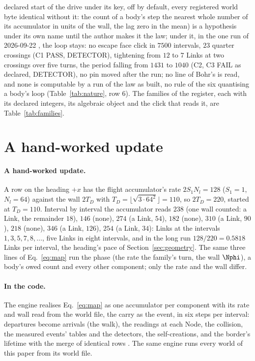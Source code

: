 declared start of the drive under its key, off by default, every registered world byte identical without it: the count of a body's step the nearest whole number of its accumulator in units of the wall, the lag zero in the mean) is a hypothesis under its own name until the author makes it the law; under it, in the one run of 2026-09-22 \cite{atomcentred}, the loop stays: no escape face click in $7500$ intervals, $23$ quarter crossings (C1 PASS, DETECTOR), tightening from $12$ to $7$ Links at two crossings over five turns, the period falling from $1431$ to $1040$ (C2, C3 FAIL as declared, DETECTOR), no pin moved after the run; no line of Bohr's is read, and none is computable by a run of the law as built, no rule of the six quantising a body's loop (Table~\ref{tab:nature}, row 6). The families of the register, each with its declared integers, its algebraic object and the click that reads it, are Table~\ref{tab:families}.  
\section{A hand-worked update}\label{rec:handworked}

\paragraph{A hand-worked update.} A row on the heading $+x$ has the
flight accumulator's rate $2S_1N_l = 128$ ($S_1 = 1$, $N_l = 64$) against
the wall $2T_D$ with $T_D = \lfloor\sqrt{3 \cdot 64^2}\rfloor = 110$, so
$2T_D = 220$, started at $T_D = 110$. Interval by interval the
accumulator reads $238$ (one wall counted: a Link, the remainder $18$),
$146$ (none), $274$ (a Link, $54$), $182$ (none), $310$ (a Link, $90$),
$218$ (none), $346$ (a Link, $126$), $254$ (a Link, $34$): Links at the
intervals $1, 3, 5, 7, 8, \dots$, five Links in eight intervals, and in
the long run $128/220 = 0.5818$ Links per interval, the heading's pace
of Section~\ref{sec:geometry}. The same three lines of
Eq.~\eqref{eq:map} run the phase (the rate the family's turn, the wall
$\Nphi$), a body's owed count and every other component; only the rate and
the wall differ.

\paragraph{In the code.} The engine realises Eq.~\eqref{eq:map} as one
accumulator per component with its rate and wall read from the world
file, the carry as the event, in six steps per interval: departures
become arrivals (the walk), the readings at each Node, the collision, the measured events' tables and the detectors, the
self-creations, and the border's lifetime with the merge of identical
rows \cite{beamlaw,engine}. The same engine runs every world of this paper from its world file.



